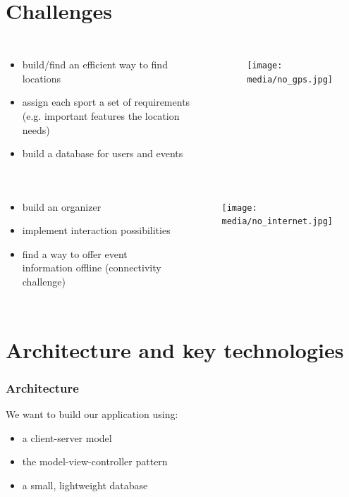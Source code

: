 \documentclass[aspectratio=169]{beamer}
\begin{document}
\section{Challenges}
\begin{frame}
\begin{columns}
	\begin{itemize}
		\item build/find an efficient way to find locations
		\item assign each sport a set of requirements (e.g. important features the location needs)
		\item build a database for users and events
	\end{itemize}
	 \begin{figure}
		 \centering
		\texttt{[image: media/no\_gps.jpg]}
	\end{figure}
\end{columns}
\end{frame}

\begin{frame}
\begin{columns}
	\begin{itemize}
		\item build an organizer 
		\item implement interaction possibilities
		\item find a way to offer event information offline (connectivity challenge)
	\end{itemize}
	 \begin{figure}
	 \centering
	\texttt{[image: media/no\_internet.jpg]}
\end{figure}
\end{columns}
\end{frame}




\section{Architecture and key technologies}
\begin{frame}
\frametitle{Architecture}
We want to build our application using:
	\begin{itemize}
		\item a client-server model 
		\item the model-view-controller pattern
		\item a small, lightweight database
	\end{itemize}
\end{frame}
\end{document}

